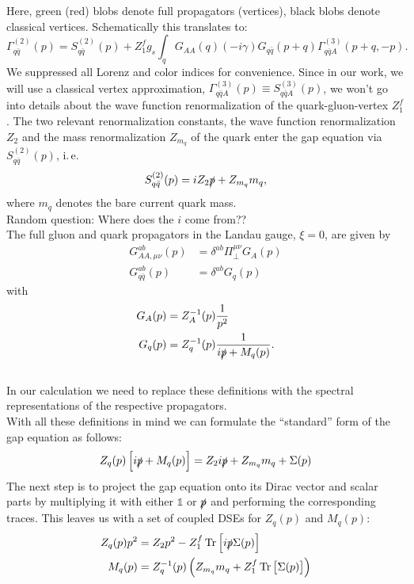\documentclass[digital, %
			   openright, %
			   parskip=half,
			   11pt]{mythesis}
\begin{document}
 Here, green (red) blobs denote full propagators (vertices), black blobs denote classical vertices. Schematically this translates to:
 \begin{equation}
 	\Gamma^{(2)}_{q\bar{q}}(p) = S^{(2)}_{q\bar{q}}(p) + Z_1^f g_s \int_q G_{AA}(q)(-i\gamma)G_{q\bar{q}}(p+q)\Gamma^{(3)}_{q\bar{q}A}(p+q, -p).
 \end{equation}
 We suppressed all Lorenz and color indices for convenience. Since in our work, we will use a classical vertex approximation, $\Gamma^{(3)}_{q\bar{q}A}(p) \equiv S^{(3)}_{q\bar{q}A}(p)$, we won't go into details about the wave function renormalization of the quark-gluon-vertex $Z_1^f$. The two relevant renormalization constants, the wave function renormalization $Z_2$ and the mass renormalization $Z_{m_q}$ of the quark enter the gap equation via $S^{(2)}_{q\bar{q}}(p)$, i.\,e. 
 \begin{equation}
 	S^{(2)}_{q\bar{q}}(p) = iZ_2\slashed{p} + Z_{m_q}m_q,
 \end{equation}
 where $m_q$ denotes the bare current quark mass. \\
 \color{MScRed} Random question: Where does the $i$ come from??\normalcolor\\
 The full gluon and quark propagators in the Landau gauge, $\xi = 0$, are given by
 \begin{align}
 G_{AA,\mu\nu}^{ab}(p)	&= \delta^{ab} \Pi_{\bot}^{\mu\nu}G_{A}(p)\\
  G_{q\bar{q}}^{ab}(p)	&= \delta^{ab} G_{q}(p)
 \end{align}
with
\begin{align}
 G_{A}(p)	&= Z_A^{-1}(p)\frac{1}{p^2}\\
  G_{q}(p)	&= Z_q^{-1}(p)\frac{1}{i\slashed{p} + M_q(p)}.
  \end{align} \\
 \color{MScRed} In our calculation we need to replace these definitions  with the spectral representations of the respective propagators. \normalcolor\\

With all these definitions in mind we can formulate the \enquote{standard} form of the gap equation as follows:
\begin{equation}
Z_{q}(p)\left[i \slashed{p}+M_{q}(p)\right]=Z_{2} i \slashed{p}+Z_{m_{q}} m_{q}+\Sigma(p)
\end{equation}
 The next step is to project the gap equation onto its Dirac vector and scalar parts by multiplying it with either $\mathbb{1}$ or $\slashed{p}$ and performing the corresponding traces. This leaves us with a set of coupled DSEs for $Z_q(p)$ and $M_q(p)$:
 \begin{align}
 Z_q(p)p^2 &= Z_2p^2 - Z_1^f \operatorname{Tr}\left[i\slashed{p}\Sigma(p)\right]\\
  M_q(p) &= Z_q^{-1}(p)\left( Z_{m_q}m_q + Z_1^f \operatorname{Tr}\left[\Sigma(p)\right]\right)
 \end{align}

 
 
 
\end{document}
